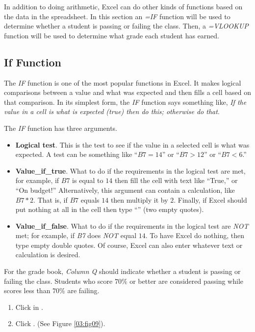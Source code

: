 In addition to doing arithmetic, Excel can do other kinds of functions based on the data in the spreadsheet. In this section an \textit{=IF} function will be used to determine whether a student is passing or failing the class. Then, a \textit{=VLOOKUP} function will be used to determine what grade each student has earned.

\subsection{If Function}

The \textit{IF} function is one of the most popular functions in Excel. It makes logical comparisons between a value and what was expected and then fills a cell based on that comparison. In its simplest form, the \textit{IF} function says something like, \textit{If the value in a cell is what is expected (true) then do this; otherwise do that}.

The \textit{IF} function has three arguments.

\begin{itemize}
	\item \textbf{Logical test}. This is the test to see if the value in a selected cell is what was expected. A test can be something like ``$ B7=14 $'' or ``$ B7>12 $'' or ``$ B7<6 $.''
	\item \textbf{Value\_if\_true}. What to do if the requirements in the logical test are met, for example, if $ B7 $ is equal to $ 14 $ then fill the cell with text like ``True,'' or ``On budget!'' Alternatively, this argument can contain a calculation, like $ B7*2 $. That is, if $ B7 $ equals $ 14 $ then multiply it by $ 2 $. Finally, if Excel should put nothing at all in the cell then type ``'' (two empty quotes).
	\item \textbf{Value\_if\_false}. What to do if the requirements in the logical test are \textit{NOT} met; for example, if \textit{B7} does \textit{NOT} equal $ 14 $. To have Excel do nothing, then type empty double quotes. Of course, Excel can also enter whatever text or calculation is desired.
\end{itemize}

For the grade book, \textit{Column Q} should indicate whether a student is passing or failing the class. Students who score $ 70\% $ or better are considered passing while scores less than $ 70\% $ are failing.

\begin{enumerate}
	\item Click in .
	\item Click . (See Figure \ref{03:fig09}).
\end{enumerate}

